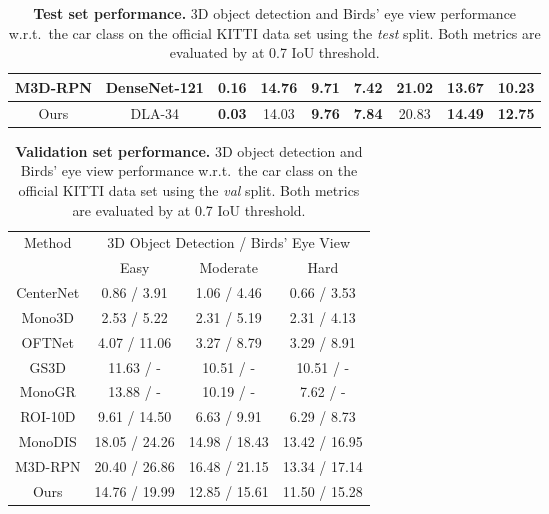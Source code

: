 \documentclass[10pt,twocolumn,letterpaper]{article}
\begin{document}
\begin{table*}[ht]
\begin{tabular}{c||c||c||ccc||ccc}
        M3D-RPN\cite{m3drpn_2019}            & DenseNet-121              & 0.16                        & \textbf{14.76}            & 9.71                          & 7.42           & \textbf{21.02}            & 13.67                         & 10.23          \\ \hline \hline
        Ours                                 & DLA-34                    & \textbf{0.03}               & 14.03                     & \textbf{9.76}                 & \textbf{7.84}  & 20.83                     & \textbf{14.49}                & \textbf{12.75} \\ \hline
        \end{tabular}
        \vspace{2mm}
        \caption{\textbf{Test set performance.} 3D object detection and Birds' eye view performance w.r.t.~the car class on the official KITTI data set using the \textit{test} split. Both metrics are evaluated by  at 0.7 IoU threshold.}
        \label{testresult} \vspace{-3mm}
    \end{table*}
    
     \begin{table}[t]
        \begin{tabular}{c||ccc}
        \hline
        \multirow{2}{*}{Method} & \multicolumn{3}{c}{3D Object Detection / Birds' Eye View}          \\ \cline{2-4} 
                                        & Easy          & Moderate      & Hard          \\ \hline
        CenterNet\cite{centernet_2019}  & 0.86 / 3.91   & 1.06 / 4.46   & 0.66 / 3.53   \\
        Mono3D\cite{mono3d_2016}        & 2.53 / 5.22   & 2.31 / 5.19   & 2.31 / 4.13   \\
        OFTNet\cite{oft_2019}           & 4.07 / 11.06  & 3.27 / 8.79   & 3.29 / 8.91   \\
        GS3D\cite{GS3D_2019}            & 11.63 / -     & 10.51 / -     & 10.51 / -     \\
        MonoGR\cite{monogr2019}         & 13.88 / -     & 10.19 / -     & 7.62 / -      \\
        ROI-10D\cite{roi10d_2019}       & 9.61 / 14.50  & 6.63 / 9.91   & 6.29 / 8.73   \\
        MonoDIS\cite{monodis_2019}& 18.05 / 24.26 & 14.98 / 18.43 & 13.42 / 16.95 \\
        M3D-RPN\cite{m3drpn_2019} & 20.40 / 26.86 & 16.48 / 21.15 & 13.34 / 17.14 \\ \hline \hline
        Ours                      & 14.76 / 19.99 & 12.85 / 15.61 & 11.50 / 15.28 \\ \hline
        \end{tabular} \vspace{-1mm}
        \caption{\textbf{Validation set performance.} 3D object detection and Birds' eye view performance w.r.t.~the car class on the official KITTI data set using the \textit{val} split. Both metrics are evaluated by  at 0.7 IoU threshold.}
        \label{valresult}
        \vspace{-3mm}
    \end{table}
\end{document}
